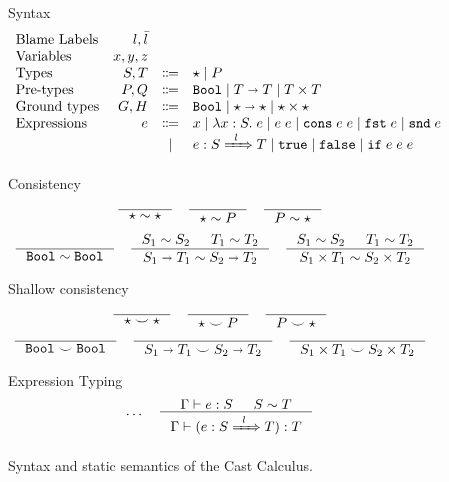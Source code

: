 \documentclass[runningheads]{llncs}
\newcommand{\infr}[2]{\inference{#1}{#2}}
\newcommand{\stxrule}[3]{\text{#2} & #1 & \Coloneqq & #3\\}
\newcommand{\stxrulecont}[1]{& & | & #1 \\}
\newcommand{\Tdyn}[0]{\ensuremath{\star}}
\newcommand{\Pbool}[0]{\ensuremath{\mathtt{Bool}}}
\newcommand{\Pfunc}[2]{\ensuremath{#1 \shortrightarrow #2}}
\newcommand{\Pprod}[2]{\ensuremath{#1 \times #2}}
\newcommand{\Gbool}[0]{\Pbool}
\newcommand{\Gfunc}[0]{\Pfunc{\Tdyn}{\Tdyn}}
\newcommand{\Gprod}[0]{\Pprod{\Tdyn}{\Tdyn}}
\newcommand{\evar}[1]{#1}
\newcommand{\elam}[3]{\lambda#1:#2.\;#3}
\newcommand{\eapp}[2]{#1\;#2}
\newcommand{\etrue}[0]{\mathtt{true}}
\newcommand{\efalse}[0]{\mathtt{false}}
\newcommand{\eif}[3]{\mathtt{if}\;#1\;#2\;#3}
\newcommand{\econs}[2]{\mathtt{cons} \; #1 \; #2}
\newcommand{\efst}[1]{\mathtt{fst} \; #1}
\newcommand{\esnd}[1]{\mathtt{snd} \; #1}
\newcommand{\ecast}[2]{\ensuremath{#1 : #2}}
\newcommand{\ccast}[3]{#1 \xRightarrow[]{\enskip #2 \enskip} #3}
\newcommand{\consistent}[2]{\ensuremath{#1\sim#2}}
\newcommand{\shallowlyconsistent}[2]{\ensuremath{#1\smile#2}}
\newcommand{\expressiontyping}[3]{\ensuremath{#1 \vdash #2 : #3}}
\begin{document}
\begin{figure}[tp]
Syntax
\[
\begin{array}{lrcl}
\text{Blame Labels} & l,\bar{l} \\
\text{Variables} & x,y,z \\
\stxrule{S,T}{Types}{
	\Tdyn \mid{}
	P
}
\stxrule{P,Q}{Pre-types}{
	\Pbool \mid
	\Pfunc{T}{T} \mid
	\Pprod{T}{T}
}
\stxrule{G,H}{Ground types}{
	\Gbool  \mid
	\Gfunc  \mid
	\Gprod
}
\stxrule{e}{Expressions}{
	\evar{x}        \mid
	\elam{x}{S}{e}  \mid
	\eapp{e}{e}     \mid
	\econs{e}{e}  \mid
	\efst{e}      \mid
	\esnd{e}
}
\stxrulecont{
	\ecast{e}{\ccast{S}{l}{T}}  \mid
	\etrue         \mid
	\efalse        \mid
	\eif{e}{e}{e}
}
\end{array}
\]
	
	\fbox{\consistent{T}{T}} Consistency
	\begin{gather*}
	\infr{}{\consistent{\Tdyn}{\Tdyn}} \quad
	\infr{}{\consistent{\Tdyn}{P}    } \quad
	\infr{}{\consistent{P}{\Tdyn}    }
	\\[1ex]
	\infr{}{
		\consistent{\Pbool}{\Pbool}
	} \quad
	\infr{
		\consistent{S_1}{S_2} &
		\consistent{T_1}{T_2}
	}{
		\consistent{\Pfunc{S_1}{T_1}}{\Pfunc{S_2}{T_2}}
	} \quad
	\infr{
		\consistent{S_1}{S_2} &
		\consistent{T_1}{T_2}
	}{
		\consistent{\Pprod{S_1}{T_1}}{\Pprod{S_2}{T_2}}
	}
	\end{gather*}
		
	\fbox{\shallowlyconsistent{T}{T}} Shallow consistency
	\begin{gather*}
	\inference{}{
		\shallowlyconsistent{\Tdyn}{\Tdyn}
	} \quad
	\inference{}{
		\shallowlyconsistent{\Tdyn}{P}
	} \quad
	\inference{}{
		\shallowlyconsistent{P}{\Tdyn}
	} \\
	\inference{}{
		\shallowlyconsistent{\Pbool}{\Pbool}
	} \quad
	\inference{}{
		\shallowlyconsistent{\Pfunc{S_1}{T_1}}{\Pfunc{S_2}{T_2}}
	} \quad
	\inference{}{
		\shallowlyconsistent{\Pprod{S_1}{T_1}}{\Pprod{S_2}{T_2}}
	}
	\end{gather*}


\fbox{$\expressiontyping{\Gamma}{e}{T}$} Expression Typing
\begin{gather*}
\dots \quad
\infr{
	\expressiontyping{\Gamma}{e}{S}  &
	\consistent{S}{T}
}{
	\expressiontyping{\Gamma}{(\ecast{e}{\ccast{S}{l}{T}})}{T}
}
\end{gather*}

\caption{Syntax and static semantics of the Cast Calculus.}
\label{fig:statics}
\end{figure}
\end{document}
